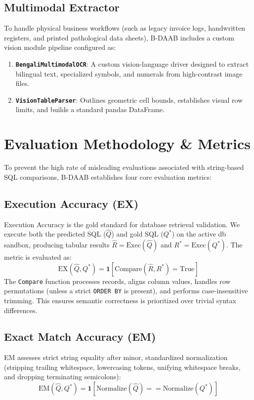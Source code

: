 \documentclass[11pt,a4paper]{article}
\begin{document}
\subsection{Multimodal Extractor}
To handle physical business workflows (such as legacy invoice logs, handwritten registers, and printed pathological data sheets), B-DAAB includes a custom vision module pipeline configured as:
\begin{enumerate}
    \item \textbf{\texttt{BengaliMultimodalOCR}}: A custom vision-language driver designed to extract bilingual text, specialized symbols, and numerals from high-contrast image files.
    \item \textbf{\texttt{VisionTableParser}}: Outlines geometric cell bounds, establishes visual row limits, and builds a standard pandas DataFrame.
\end{enumerate}

\section{Evaluation Methodology & Metrics}
To prevent the high rate of misleading evaluations associated with string-based SQL comparisons, B-DAAB establishes four core evaluation metrics:

\subsection{Execution Accuracy (EX)}
Execution Accuracy is the gold standard for database retrieval validation. We execute both the predicted SQL ($\hat{Q}$) and gold SQL ($Q^*$) on the active db sandbox, producing tabular results $\hat{R} = \text{Exec}(\hat{Q})$ and $R^* = \text{Exec}(Q^*)$. The metric is evaluated as:
\begin{equation}
    \text{EX}(\hat{Q}, Q^*) = \mathbf{1}[\text{Compare}(\hat{R}, R^*) = \text{True}]
\end{equation}
The \texttt{Compare} function processes records, aligns column values, handles row permutations (unless a strict \texttt{ORDER BY} is present), and performs case-insensitive trimming. This ensures semantic correctness is prioritized over trivial syntax differences.

\subsection{Exact Match Accuracy (EM)}
EM assesses strict string equality after minor, standardized normalization (stripping trailing whitespace, lowercasing tokens, unifying whitespace breaks, and dropping terminating semicolons):
\begin{equation}
    \text{EM}(\hat{Q}, Q^*) = \mathbf{1}[\text{Normalize}(\hat{Q}) == \text{Normalize}(Q^*)]
\end{equation}
\end{document}
